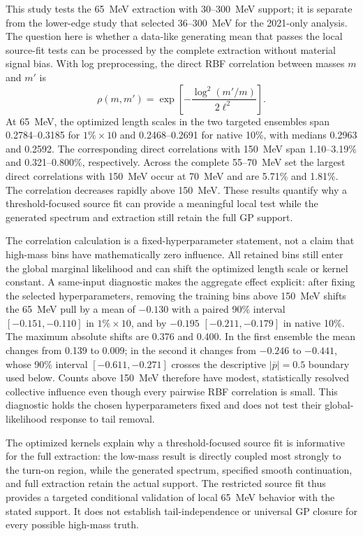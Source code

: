 This study tests the 65~MeV extraction with 30--300~MeV support; it is separate from
the lower-edge study that selected 36--300~MeV for the 2021-only analysis. The question
here is whether a data-like generating mean that passes the local
source-fit tests can be processed by the complete extraction without material signal
bias.  With log preprocessing, the direct RBF correlation between masses $m$ and
$m'$ is
\begin{equation}
 \rho(m,m')=\exp\!\left[-\frac{\log^2(m'/m)}{2\ell^2}\right].
\end{equation}
At 65~MeV, the optimized length scales in the two targeted
ensembles span 0.2784--0.3185 for $1\%\times10$ and 0.2468--0.2691 for native
10\%, with medians 0.2963 and 0.2592.  The corresponding direct correlations with
150~MeV span 1.10--3.19\% and 0.321--0.800\%, respectively.  Across the complete
55--70~MeV set the largest direct correlations with 150~MeV occur at 70~MeV and are
5.71\% and 1.81\%.  The correlation decreases rapidly above 150~MeV.  These results quantify why a
threshold-focused source fit can provide a meaningful local test while the generated
spectrum and extraction still retain the full GP support.

The correlation calculation is a fixed-hyperparameter statement, not a claim that
high-mass bins have mathematically zero influence.  All retained bins still enter the
global marginal likelihood and can shift the optimized length scale or kernel
constant.  A same-input diagnostic makes the aggregate effect explicit: after fixing
the selected hyperparameters, removing the training bins above 150~MeV shifts the
65~MeV pull by a mean of $-0.130$ with a paired 90\% interval
$[-0.151,-0.110]$ in $1\%\times10$, and by $-0.195$
$[-0.211,-0.179]$ in native 10\%.  The maximum absolute shifts are 0.376 and
0.400. In the first ensemble the mean changes from 0.139 to 0.009; in the second it
changes from $-0.246$ to $-0.441$, whose 90\% interval
$[-0.611,-0.271]$ crosses the descriptive $|\overline p|=0.5$ boundary used below.
Counts above 150~MeV
therefore have modest, statistically resolved collective influence even though every
pairwise RBF correlation is small.  This diagnostic holds the chosen hyperparameters
fixed and does not test their global-likelihood response to tail removal.

The optimized kernels explain why a threshold-focused source fit is informative for
the full extraction: the low-mass result is
directly coupled most strongly to the turn-on region, while the generated spectrum,
specified smooth continuation, and full extraction retain the actual support.  The
restricted source fit thus provides a targeted conditional validation of local
65~MeV behavior with the stated support. It does not establish
tail-independence or universal GP closure for every possible high-mass truth.

